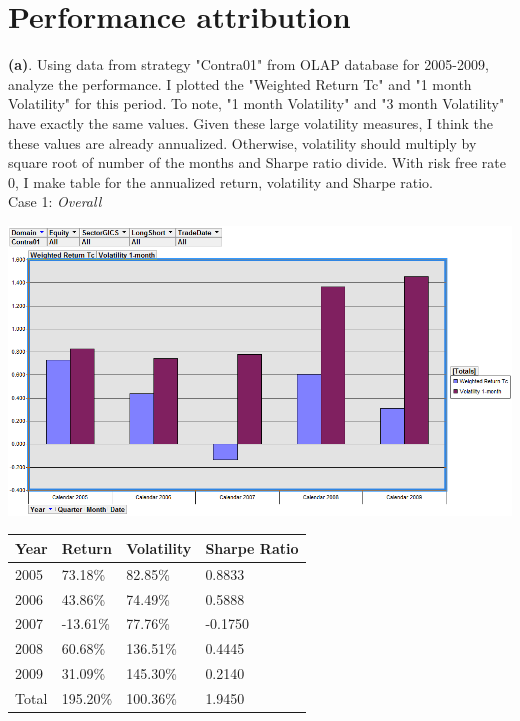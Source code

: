 \documentclass[11pt,letter]{article}
\begin{document}
\section{Performance attribution}

\textbf{(a)}. Using data from strategy "Contra01" from OLAP database for 2005-2009, analyze the performance. I plotted the "Weighted Return Tc" and "1 month Volatility" for this period. To note, "1 month Volatility" and "3 month Volatility" have exactly the same values. Given these large volatility measures, I think the these values are already annualized. Otherwise, volatility should multiply by square root of number of the months and Sharpe ratio divide. With risk free rate 0, I make table for the annualized return, volatility and Sharpe ratio.\\

Case 1: \textit{Overall}
\begin{center}
\includegraphics[scale=0.5,keepaspectratio]{2a_overall}
\newline

\begin{tabular}{l | l l l}
Year & Return & Volatility & Sharpe Ratio\\
\hline
2005	 & 73.18\% & 82.85\% & 0.8833\\
2006	 & 43.86\% & 74.49\% & 0.5888\\
2007	&-13.61\%	&77.76\%	&-0.1750\\
2008	&60.68\%	&136.51\%	&0.4445\\
2009	&31.09\%	&145.30\%	&0.2140\\
\hline
Total&	195.20\%	&100.36\%	&1.9450
\end{tabular}
\end{center}
\end{document}

